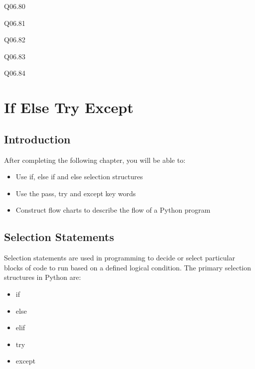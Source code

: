 \documentclass{book}
\providecommand{\tightlist}{%
      \setlength{\itemsep}{0pt}\setlength{\parskip}{0pt}}
\begin{document}
Q06.80

Q06.81

Q06.82

Q06.83

Q06.84
    




    
        \chapter{If Else Try Except}\label{if-else-try-except}
    




    
        \section{Introduction}\label{introduction}
    




    
        After completing the following chapter, you will be able to:

\begin{itemize}
\item
  Use if, else if and else selection structures
\item
  Use the pass, try and except key words
\item
  Construct flow charts to describe the flow of a Python program
\end{itemize}
        \newpage



    




    
        \section{Selection Statements}\label{selection-statements}
    




    
        Selection statements are used in programming to decide or select
particular blocks of code to run based on a defined logical condition.
The primary selection structures in Python are:

\begin{itemize}
\tightlist
\item
  if
\item
  else
\item
  elif
\item
  try
\item
  except
\end{itemize}
    
\end{document}
